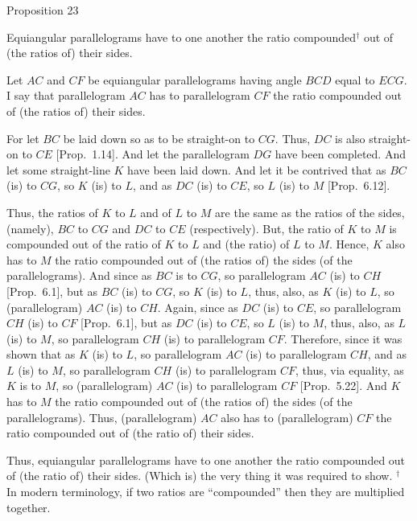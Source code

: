
\begin{center}
{\large Proposition 23}
\end{center}

Equiangular parallelograms have to one another the ratio compounded$^\dag$ out of  (the ratios of) their sides.

Let $AC$ and $CF$ be equiangular parallelograms having angle $BCD$ equal to
$ECG$. I say that parallelogram $AC$ has to parallelogram $CF$ the ratio compounded out of (the ratios of) their sides.

For let $BC$ be laid down so as to be straight-on to $CG$. Thus, $DC$ is also straight-on
to $CE$ [Prop.~1.14]. And let the parallelogram $DG$ have been completed. And let
some straight-line $K$ have been laid down. And let it be contrived that as $BC$ (is) to $CG$, so $K$ (is) to $L$, and as $DC$ (is) to $CE$,
so $L$ (is) to $M$ [Prop.~6.12].

Thus, the ratios of $K$ to $L$ and of $L$ to $M$ are the same as the ratios
of the sides, (namely), $BC$ to $CG$ and $DC$ to $CE$ (respectively). 
But, the ratio of $K$ to $M$ is compounded out of the ratio of $K$ to $L$
and (the ratio) of $L$ to $M$. Hence, $K$ also has to $M$ the ratio compounded out of
(the ratios of)  the sides
(of the parallelograms).
And since as $BC$ is to $CG$, so parallelogram $AC$ (is) to $CH$ [Prop.~6.1], but as $BC$ (is) to $CG$, so 
$K$ (is) to $L$, thus, also, as $K$ (is) to $L$, so (parallelogram) $AC$ (is) to $CH$.
Again, since as $DC$ (is) to $CE$, so parallelogram $CH$ (is) to $CF$
[Prop.~6.1], but 
as $DC$ (is) to $CE$, so $L$ (is) to $M$, thus, also, as $L$ (is) to $M$, so parallelogram
$CH$ (is) to parallelogram $CF$. Therefore, since it was shown that as $K$
(is) to $L$, so parallelogram $AC$ (is) to parallelogram $CH$, and as $L$ (is)
to $M$, so parallelogram $CH$ (is) to parallelogram $CF$, thus, via equality, 
as $K$ is to $M$, so (parallelogram) $AC$ (is) to parallelogram $CF$ [Prop.~5.22]. And $K$ has to $M$ the ratio compounded
out of (the ratios of) the  sides (of the parallelograms). Thus, (parallelogram) $AC$
also has to (parallelogram) $CF$ the ratio compounded out of (the ratio of) their sides.\\

\epsfysize=2in
\centerline{}

Thus, equiangular parallelograms have to one another the ratio compounded out of (the ratio  of)  their sides. (Which is) the very thing it was required to show.
{\footnotesize\noindent$^\dag$ In modern terminology, if two
ratios are ``compounded'' then they are multiplied together.}

